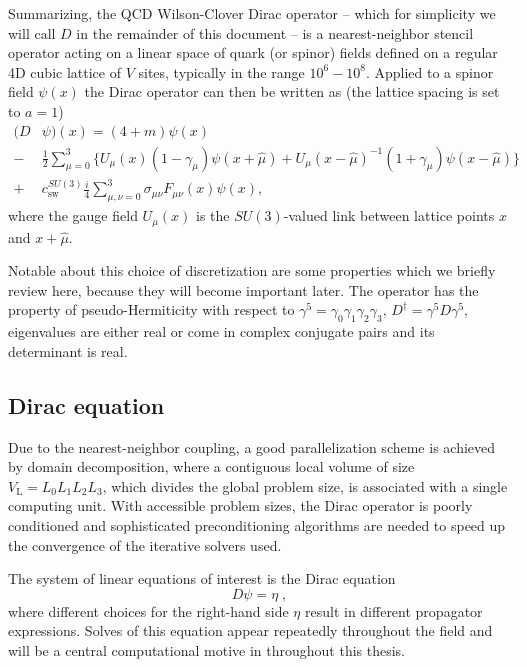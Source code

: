 Summarizing, the QCD Wilson-Clover Dirac operator -- which for simplicity we will call $D$ in the remainder of this document -- is a nearest-neighbor stencil operator acting on a linear space of quark (or spinor) fields defined on a regular 4D cubic lattice of $V$ sites, typically in the range $10^6-10^8$.
Applied to a spinor field $\psi(x)$ the Dirac operator can then be written as (the lattice spacing is set to $a = 1$)
\begin{equation}
\begin{aligned} \label{eq:Dw}
(D &\psi)(x) = (4 + m) \psi(x) \\
-&\frac{1}{2} \sum_{\mu=0}^3 \Big\{
  U_{\mu}(x) (1-\gamma_{\mu}) \psi(x + \hat{\mu})
+ U_{\mu}(x-\hat{\mu})^{-1} (1+\gamma_{\mu}) \psi(x-\hat{\mu})
\Big\} \\
+&c_\mathrm{sw}^{SU(3)} \frac{i}{4} \sum_{\mu,\nu=0}^3 \sigma_{\mu \nu} F_{\mu \nu}(x) \psi(x),
\end{aligned}
\end{equation}
where the gauge field $U_{\mu}(x)$ is the $SU(3)$-valued link between lattice points $x$ and $x + \hat{\mu}$.

Notable about this choice of discretization are some properties which we briefly review here, because they will become important later.
The operator has the property of pseudo-Hermiticity with respect to $\gamma^5 = \gamma_0 \gamma_1 \gamma_2 \gamma_3$, $D^{\dagger} = \gamma^{5} D \gamma^{5}$, eigenvalues are either real or come in complex conjugate pairs and its determinant is real.

\subsection{Dirac equation}

Due to the nearest-neighbor coupling, a good parallelization scheme is achieved by domain decomposition, where a contiguous local volume of size $V_\mathrm{L}=L_0L_1L_2L_3$, which divides the global problem size, is associated with a single computing unit.
With accessible problem sizes, the Dirac operator is poorly conditioned and sophisticated preconditioning algorithms are needed to speed up the convergence of the iterative solvers used.

The system of linear equations of interest is the Dirac equation
\begin{equation} \label{eq:dirac:equation}
  D \psi = \eta \;,
\end{equation}
where different choices for the right-hand side $\eta$ result in different propagator expressions.
Solves of this equation appear repeatedly throughout the field and will be a central computational motive in throughout this thesis.

